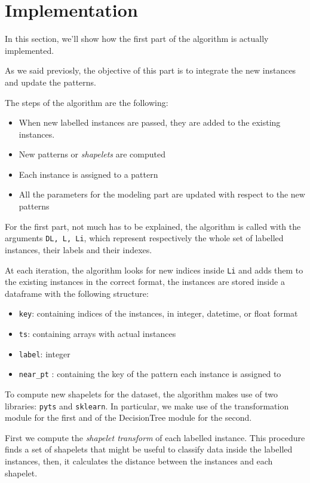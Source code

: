\section{Implementation}

In this section, we'll show how the first part of the algorithm is actually implemented.

As we said previosly, the objective of this part is to integrate the new instances and update the patterns.

The steps of the algorithm are the following:
\begin{itemize}
    \item When new labelled instances are passed, they are added to the existing instances.
    \item New patterns or \textit{shapelets} are computed 
    \item Each instance is assigned to a pattern 
    \item All the parameters for the modeling part are updated with respect to the new patterns
\end{itemize}

For the first part, not much has to be explained, the algorithm is called with the arguments 
\texttt{DL, L, Li}, which represent respectively the whole set of labelled instances, their labels and their
indexes.

At each iteration, the algorithm looks for new indices inside \texttt{Li} and adds them to the existing 
instances in the correct format, the instances are stored inside a dataframe with the following structure:
\begin{itemize}
    \item \texttt{key}: containing indices of the instances, in integer, datetime, or float format 
    \item \texttt{ts}: containing arrays with actual instances
    \item \texttt{label}: integer
    \item \texttt{near\_pt} : containing the key of the pattern each instance is assigned to
\end{itemize}

To compute new shapelets for the dataset, the algorithm makes use of two libraries: \texttt{pyts} and 
\texttt{sklearn}. In particular, we make use of the transformation module for the first and of the 
DecisionTree module for the second. 

First we compute the \textit{shapelet transform} of each labelled instance. This procedure finds a set of 
shapelets that might be useful to classify data inside the labelled instances, then, it calculates the distance
between the instances and each shapelet.

